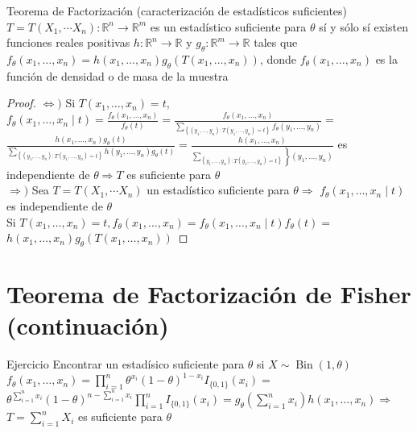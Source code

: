 \begin{teorema}
	Teorema de Factorización (caracterización de estadísticos suficientes) $T=T\left(X_{1}, \cdots X_{n}\right): \mathbb{R}^{n} \longrightarrow \mathbb{R}^{m}$ es un estadístico suficiente para $\theta$ sí y sólo sí existen funciones reales positivas $h: \mathbb{R}^{n} \longrightarrow \mathbb{R}$ y $g_{\theta}: \mathbb{R}^{m} \longrightarrow \mathbb{R}$ tales que $f_{\theta}\left(x_{1}, \ldots, x_{n}\right)=h\left(x_{1}, \ldots, x_{n}\right) g_{\theta}\left(T\left(x_{1}, \ldots, x_{n}\right)\right)$, donde $f_{\theta}\left(x_{1}, \ldots, x_{n}\right)$ es la función de densidad o de masa de la muestra
\end{teorema}


\begin{proof}
	\leavevmode
	$\Leftrightarrow)$ Si $T\left(x_{1}, \ldots, x_{n}\right)=t$,\\
	$f_{\theta}\left(x_{1}, \ldots, x_{n} \mid t\right)=\frac{f_{\theta}\left(x_{1}, \ldots, x_{n}\right)}{f_{\theta}(t)}=\frac{f_{\theta}\left(x_{1}, \ldots, x_{n}\right)}{\sum_{\left\{\left(y_{1}, \ldots, y_{n}\right): T\left(y_{1}, \ldots, y_{n}\right)=t\right\}} f_{\theta}\left(y_{1}, \ldots, y_{n}\right)}=$\\
	$\frac{h\left(x_{1}, \ldots, x_{n}\right) g_{\theta}(t)}{\sum_{\left\{\left(y_{1}, \ldots, y_{n}\right): T\left(y_{1}, \ldots, y_{n}\right)=t\right\}} h\left(y_{1}, \ldots, y_{n}\right) g_{\theta}(t)}=\frac{h\left(x_{1}, \ldots, x_{n}\right)}{\left.\sum_{\left.\left\{y_{1}, \ldots, y_{n}\right): T\left(y_{1}, \ldots, y_{n}\right)=t\right\}}\right\}\left(y_{1}, \ldots, y_{n}\right)}$ es\\
	independiente de $\theta \Rightarrow T$ es suficiente para $\theta$\\
	$\Rightarrow)$ Sea $T=T\left(X_{1}, \cdots X_{n}\right)$ un estadístico suficiente para $\theta \Rightarrow$ $f_{\theta}\left(x_{1}, \ldots, x_{n} \mid t\right)$ es independiente de $\theta$\\
	Si $T\left(x_{1}, \ldots, x_{n}\right)=t, f_{\theta}\left(x_{1}, \ldots, x_{n}\right)=f_{\theta}\left(x_{1}, \ldots, x_{n} \mid t\right) f_{\theta}(t)=$ $h\left(x_{1}, \ldots, x_{n}\right) g_{\theta}\left(T\left(x_{1}, \ldots, x_{n}\right)\right)$
\end{proof}



\section*{Teorema de Factorización de Fisher (continuación)}
Ejercicio Encontrar un estadísico suficiente para $\theta$ si $X \sim \operatorname{Bin}(1, \theta)$ $f_{\theta}\left(x_{1}, \ldots, x_{n}\right)=\prod_{i=1}^{n} \theta^{x_{i}}(1-\theta)^{1-x_{i}} I_{\{0,1\}}\left(x_{i}\right)=$ $\theta^{\sum_{i=1}^{n} x_{i}}(1-\theta)^{n-\sum_{i=1}^{n} x_{i}} \prod_{i=1}^{n} I_{\{0,1\}}\left(x_{i}\right)=g_{\theta}\left(\sum_{i=1}^{n} x_{i}\right) h\left(x_{1}, \ldots, x_{n}\right) \Rightarrow$ $T=\sum_{i=1}^{n} X_{i}$ es suficiente para $\theta$

